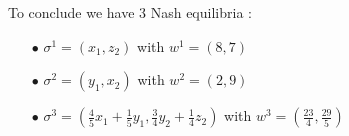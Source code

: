 To conclude we have 3 Nash equilibria :
\begin{itemize}
  \item[$\bullet$]  $\sigma^1 = \left(x_1,z_2\right)$ with $w^1= \left(8,7\right)$
  \item[$\bullet$]  $\sigma^2 = \left(y_1,x_2\right)$ with $w^2= \left(2,9\right)$
  \item[$\bullet$]  $\sigma^3 = \left( \frac{4}{5}x_1 + \frac{1}{5}y_1, \frac{3}{4}y_2 + \frac{1}{4}z_2\right)$ with $w^3= \left(\frac{23}{4},\frac{29}{5}\right)$
\end{itemize}
